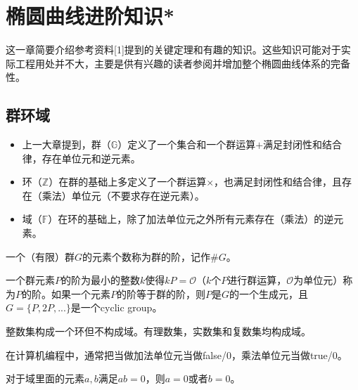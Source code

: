 \documentclass[12pt]{article}
\newcommand{\ec}{椭圆曲线}
\newcommand{\oo}{\mathcal{O}}
\begin{document}
\section{\ec 进阶知识*}
这一章简要介绍参考资料[1]提到的关键定理和有趣的知识。这些知识可能对于实际工程用处并不大，主要是供有兴趣的读者参阅并增加整个\ec 体系的完备性。
\subsection{群环域}
\begin{itemize}
\item 上一大章提到，群（$\mathbb{G}$）定义了一个集合和一个群运算$+$满足封闭性和结合律，存在单位元和逆元素。

\item 环（$\mathbb{Z}$）在群的基础上多定义了一个群运算$\times$，也满足封闭性和结合律，且存在（乘法）单位元（不要求存在逆元素）。

\item 域（$\mathbb{F}$）在环的基础上，除了加法单位元之外所有元素存在（乘法）的逆元素。
\end{itemize}
一个（有限）群$G$的元素个数称为群的阶，记作$\#G$。

一个群元素$P$的阶为最小的整数$k$使得$kP = \oo$（$k$个$P$进行群运算，$\oo$为单位元）称为$P$的阶。如果一个元素$P$的阶等于群的阶，则$P$是$G$的一个生成元，且$G=\{P,2P,...\}$是一个cyclic group。


整数集构成一个环但不构成域。有理数集，实数集和复数集均构成域。

在计算机编程中，通常把当做加法单位元当做false/0，乘法单位元当做true/0。

对于域里面的元素$a,b$满足$ab=0$，则$a=0$或者$b=0$。
\end{document}
